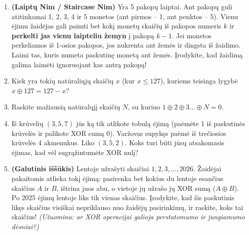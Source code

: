 \documentclass[11pt,a4paper]{scrartcl}
\begin{document}
\begin{enumerate}
    \item \textbf{(Laiptų Nim / Staircase Nim)} Yra 5 pakopų laiptai. Ant pakopų guli atitinkamai 1, 2, 3, 4 ir 5 monetos (ant pirmos – 1, ant penktos – 5). Vienu ėjimu žaidėjas gali paimti bet kokį monetų skaičių iš pakopos numeris $k$ ir \textbf{perkelti jas vienu laipteliu žemyn} į pakopą $k-1$. Jei monetos perkeliamos iš 1-osios pakopos, jos nukrenta ant žemės ir dingsta iš žaidimo. Laimi tas, kuris numeta paskutinę monetą ant žemės. Įrodykite, kad žaidimą galima laimėti ignoruojant kas antrą pakopą!
    \item Kiek yra tokių natūraliųjų skaičių $x$ (kur $x \le 127$), kuriems teisinga lygybė $x \oplus 127 = 127 - x$?
    \item Raskite mažiausią natūralųjį skaičių $N$, su kuriuo $1 \oplus 2 \oplus 3 \dots \oplus N = 0$.
    \item Iš krūvelių $(3, 5, 7)$ jūs ką tik atlikote tobulą ėjimą (paėmėte 1 iš paskutinės krūvelės ir palikote XOR sumą 0). Varžovas supykęs paėmė iš trečiosios krūvelės 4 akmenukus. Liko $(3, 5, 2)$. Koks turi būti jūsų atsakomasis ėjimas, kad vėl sugrąžintumėte XOR nulį?
    \item \textbf{(Galutinis iššūkis)} Lentoje užrašyti skaičiai $1, 2, 3, \dots, 2026$. Žaidėjai pakaitomis atlieka tokį ėjimą: pasirenka bet kokius du lentoje esančius skaičius $A$ ir $B$, ištrina juos abu, o vietoje jų užrašo jų XOR sumą ($A \oplus B$). Po 2025 ėjimų lentoje liks tik vienas skaičius. Įrodykite, kad šis paskutinis likęs skaičius visiškai nepriklauso nuo žaidėjų pasirinkimų, ir raskite, koks tai skaičius! \textit{(Užuomina: ar XOR operacijai galioja perstatomumo ir jungiamumo dėsniai?)}
\end{enumerate}
\end{document}
